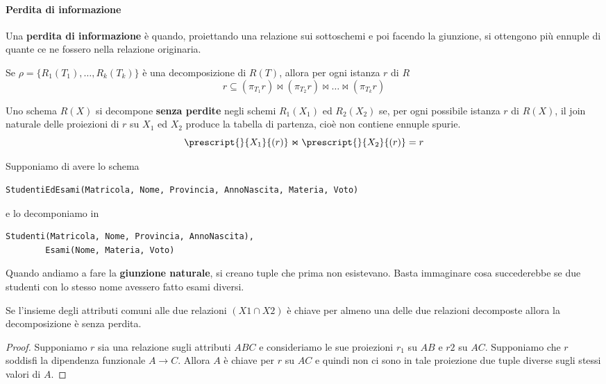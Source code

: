 \paragraph{Perdita di informazione}
Una \textbf{perdita di informazione} è quando, proiettando una relazione sui sottoschemi e poi facendo la giunzione, si ottengono più ennuple di quante ce ne fossero nella relazione originaria.
\begin{theorem}
	Se $\rho = \{R_1(T_1), \ldots, R_k(T_k)\}$ è una decomposizione di $R(T)$, allora per ogni istanza $r$ di $R$
	\begin{equation}
		r \subseteq (\pi_{T_1}r) \Join (\pi_{T_2}r) \Join \ldots \Join (\pi_{T_k}r)
	\end{equation}
\end{theorem}

Uno schema $R(X)$ si decompone \textbf{senza perdite} negli schemi $R_1(X_1)$ ed $R_2(X_2)$ se, per ogni possibile istanza $r$ di $R(X)$, il join naturale delle proiezioni di $r$ su $X_1$ ed $X_2$ produce la tabella di partenza, cioè non contiene ennuple spurie.
\begin{equation*}
	\prescript{}{X_1}{(r)} \Join \prescript{}{X_2}{(r)} = r
\end{equation*}

\begin{example}
	Supponiamo di avere lo schema
	\begin{lstlisting}[language=SQL]
		StudentiEdEsami(Matricola, Nome, Provincia, AnnoNascita, Materia, Voto)
	\end{lstlisting}
	e lo decomponiamo in
	\begin{lstlisting}[language=SQL]
		Studenti(Matricola, Nome, Provincia, AnnoNascita),
		Esami(Nome, Materia, Voto)
	\end{lstlisting}
	Quando andiamo a fare la \textbf{giunzione naturale}, si creano tuple che prima non esistevano. Basta immaginare cosa succederebbe se due studenti con lo stesso nome avessero fatto esami diversi.
\end{example}

\begin{theorem}
	Se l’insieme degli attributi comuni alle due relazioni $(X1 \cap X2)$ è chiave per almeno una delle due relazioni decomposte allora la decomposizione è senza perdita.
\end{theorem}

\begin{proof}
	Supponiamo $r$ sia una relazione sugli attributi $ABC$ e consideriamo le sue proiezioni $r_1$ su $AB$ e $r2$ su $AC$. Supponiamo che $r$ soddisfi la dipendenza funzionale $A \to C$. Allora $A$ è chiave per $r$ su $AC$ e quindi non ci sono in tale proiezione due tuple diverse sugli stessi valori di $A$.
\end{proof}

